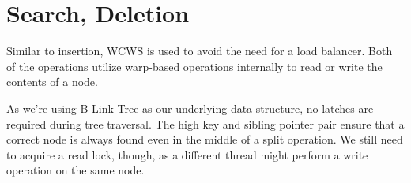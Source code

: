 \section{Search, Deletion}

Similar to insertion, WCWS is used to avoid the need for a load balancer. Both of the operations utilize warp-based operations internally to read or write the contents of a node.

As we're using B-Link-Tree as our underlying data structure, no latches are required during tree traversal. The high key and sibling pointer pair ensure that a correct node is always found even in the middle of a split operation. We still need to acquire a read lock, though, as a different thread might perform a write operation on the same node.